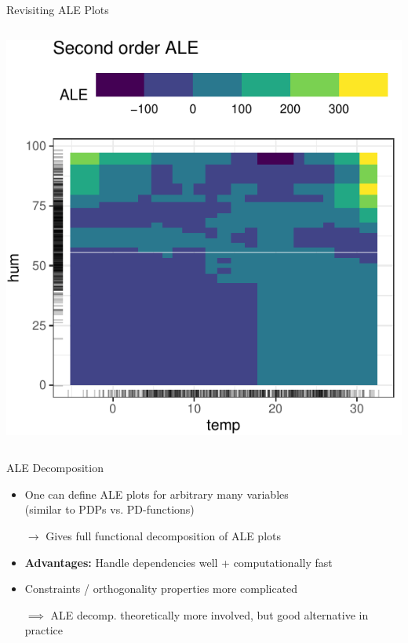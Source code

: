 \documentclass[10pt,compress,t,notes=noshow, xcolor=table]{beamer}
\begin{document}
\begin{frame}{Revisiting ALE Plots}
\begin{columns}[c, totalwidth=\linewidth]
\begin{column}{0.5\textwidth}
        \includegraphics{figure/ale2d}
    \end{column}
    \end{columns}

    
\end{frame}

\begin{frame}{ALE Decomposition}

    \begin{itemize}
        \item One can define ALE plots for arbitrary many variables \\
        (similar to PDPs vs. PD-functions)
        \item[$\rightarrow$] Gives full functional decomposition of ALE plots
        \pause
        \item \textbf{Advantages:} Handle dependencies well + computationally fast
        \item Constraints / orthogonality properties more complicated
        \item[$\implies$] ALE decomp. theoretically more involved, but good alternative in practice
    \end{itemize}
    
\end{frame}
\end{document}
